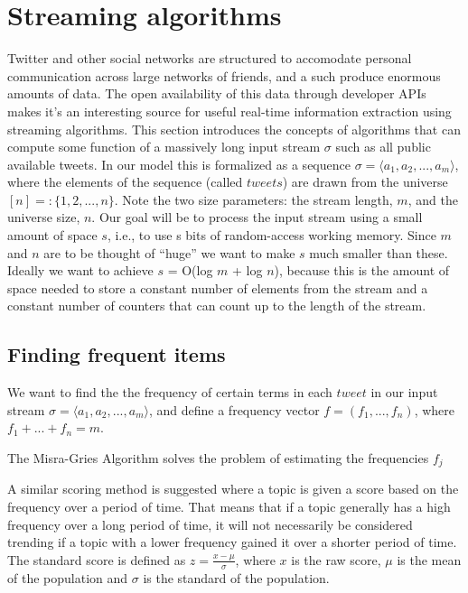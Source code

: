 \documentclass[12pt]{article}
\begin{document}
\section{Streaming algorithms}\label{related work}
Twitter and other social networks are structured to accomodate personal communication across large networks of friends, and a such produce enormous amounts of data. The open availability of this data through developer APIs makes it's an interesting source for useful real-time information extraction using streaming algorithms. \cite{genderprediction} 
This section introduces the concepts of algorithms that can compute some function of a massively long input stream $\sigma$ such as all public available tweets. In our model this is formalized as a sequence $\sigma = \langle a_{1}, a_{2},...,a_{m}\rangle $, where the elements of the sequence (called $tweets$) are drawn from the universe $[n] =: \{1, 2,..., n\}$. Note the two size parameters: the stream length, $m$, and the universe size, $n$.
Our goal will be to process the input stream using a small amount of space $s$, i.e., to use s bits of random-access working memory. Since $m$ and $n$ are to be thought of ``huge'' we want to make $s$ much smaller than these. Ideally we want to achieve $s$ = O(log $m$ + log $n$), because this is the amount of space needed to store a constant number of elements from the stream and a constant number of counters that can count up to the length of the stream. \cite{Amit}

\subsection{Finding frequent items}
We want to find the the frequency of certain terms in each $tweet$ in our input stream $\sigma = \langle a_{1}, a_{2},...,a_{m}\rangle$, and define a frequency vector $f = (f_{1},...,f_{n})$, where $f_{1} + ... + f_{n} = m$. 

The Misra-Gries Algorithm solves the problem of estimating the frequencies $f_{j}$ \cite{Amit}

A similar scoring method is suggested where a topic is given a score based on the frequency over a period of time. That means that if a topic generally has a high frequency over a long period of time, it will not necessarily be considered trending if a topic with a lower frequency gained it over a shorter period of time. The standard score is defined as $z = \frac{x - \mu}{\sigma}$, where $x$ is the raw score, $\mu$ is the mean of the population and $\sigma$ is the standard of the population.
\end{document}
